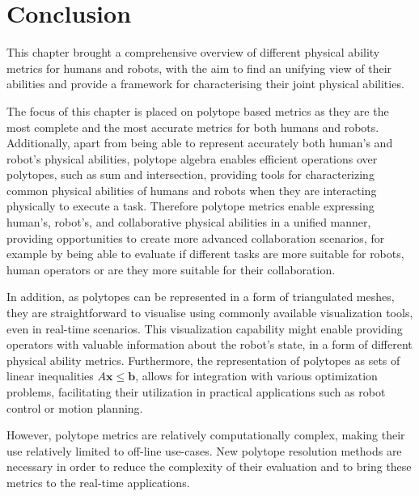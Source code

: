 \section{Conclusion}

This chapter brought a comprehensive overview of different physical ability metrics for humans and robots, with the aim to find an unifying view of their abilities and provide a framework for characterising their joint physical abilities.

The focus of this chapter is placed on polytope based metrics as they are the most complete and the most accurate metrics for both humans and robots. Additionally, apart from being able to represent accurately both human's and robot's physical abilities, polytope algebra enables efficient operations over polytopes, such as sum and intersection, providing tools for characterizing common physical abilities of humans and robots when they are interacting physically to execute a task. Therefore polytope metrics enable expressing human's, robot's, and collaborative physical 
abilities in a unified manner, providing opportunities to create more advanced collaboration scenarios, for example by being able to evaluate if different tasks are more suitable for robots, human operators or are they more suitable for their collaboration.

In addition, as polytopes can be represented in a form of triangulated meshes, they are straightforward to visualise using commonly available visualization tools, even in real-time scenarios. This visualization capability might enable providing operators with valuable information about the robot's state, in a form of different physical ability metrics. Furthermore, the representation of polytopes as sets of linear inequalities $A\bm{x}\leq\bm{b}$, allows for integration with various optimization problems, facilitating their utilization in practical applications such as robot control or motion planning.

However, polytope metrics are relatively computationally complex, making their use relatively limited to off-line use-cases. New polytope resolution methods are necessary in order to reduce the complexity of their evaluation and to bring these metrics to the real-time applications.